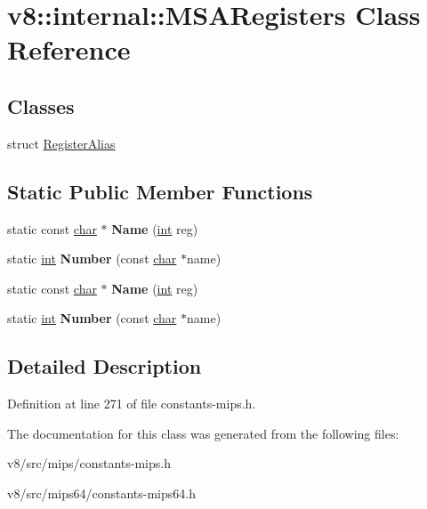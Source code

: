 \hypertarget{classv8_1_1internal_1_1MSARegisters}{}\section{v8\+:\+:internal\+:\+:M\+S\+A\+Registers Class Reference}
\label{classv8_1_1internal_1_1MSARegisters}
\subsection*{Classes}
\begin{DoxyCompactItemize}
\item 
struct \mbox{\hyperlink{structv8_1_1internal_1_1MSARegisters_1_1RegisterAlias}{Register\+Alias}}
\end{DoxyCompactItemize}
\subsection*{Static Public Member Functions}
\begin{DoxyCompactItemize}
\item 
\mbox{\label{classv8_1_1internal_1_1MSARegisters_a6ff119d0a725ba1e905d38ca4cea0206}} 
static const \mbox{\hyperlink{classchar}{char}} $\ast$ {\bfseries Name} (\mbox{\hyperlink{classint}{int}} reg)
\item 
\mbox{\label{classv8_1_1internal_1_1MSARegisters_a4ef7c38b5cf9b655a21859f122aa3757}} 
static \mbox{\hyperlink{classint}{int}} {\bfseries Number} (const \mbox{\hyperlink{classchar}{char}} $\ast$name)
\item 
\mbox{\label{classv8_1_1internal_1_1MSARegisters_a6ff119d0a725ba1e905d38ca4cea0206}} 
static const \mbox{\hyperlink{classchar}{char}} $\ast$ {\bfseries Name} (\mbox{\hyperlink{classint}{int}} reg)
\item 
\mbox{\label{classv8_1_1internal_1_1MSARegisters_a4ef7c38b5cf9b655a21859f122aa3757}} 
static \mbox{\hyperlink{classint}{int}} {\bfseries Number} (const \mbox{\hyperlink{classchar}{char}} $\ast$name)
\end{DoxyCompactItemize}


\subsection{Detailed Description}


Definition at line 271 of file constants-\/mips.\+h.



The documentation for this class was generated from the following files\+:\begin{DoxyCompactItemize}
\item 
v8/src/mips/constants-\/mips.\+h\item 
v8/src/mips64/constants-\/mips64.\+h\end{DoxyCompactItemize}
